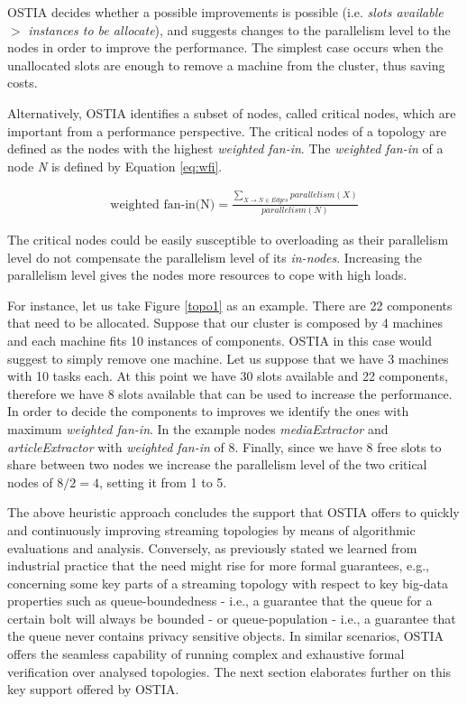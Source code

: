 OSTIA decides whether a possible improvements is possible (i.e. \emph{slots
  available} $>$ \emph{instances to be allocate}), and suggests changes to the
parallelism level to the nodes in order to improve the performance. The simplest
case occurs when the unallocated slots are enough to remove a machine from the
cluster, thus saving costs.

Alternatively, OSTIA identifies a subset of nodes, called critical nodes, which
are important from a performance perspective. The critical nodes of a topology
are defined as the nodes with the highest \emph{weighted fan-in}. The
\emph{weighted fan-in} of a node \emph{N} is defined by Equation \ref{eq:wfi}.

\begin{align}
  \text{weighted fan-in(N)} = \frac{\sum_{X \rightarrow N \in Edges} parallelism(X)}{parallelism(N)} \label{eq:wfi}
\end{align}

The critical nodes could be easily susceptible to overloading as their
parallelism level do not compensate the parallelism level of its
\emph{in-nodes}. Increasing the parallelism level gives the nodes more resources
to cope with high loads.

For instance, let us take Figure \ref{topo1} as an example. There are 22
components that need to be allocated. Suppose that our cluster is composed by 4
machines and each machine fits 10 instances of components. OSTIA in this case
would suggest to simply remove one machine. Let us suppose that we have 3
machines with 10 tasks each. At this point we have 30 slots available and 22
components, therefore we have 8 slots available that can be used to increase the
performance. In order to decide the components to improves we identify the ones
with maximum \emph{weighted fan-in}. In the example nodes \emph{mediaExtractor}
and \emph{articleExtractor} with \emph{weighted fan-in} of 8. Finally, since we
have 8 free slots to share between two nodes we increase the parallelism level
of the two critical nodes of $8/2 = 4$, setting it from 1 to 5.

The above heuristic approach concludes the support that OSTIA offers to quickly and continuously improving streaming topologies by means of algorithmic evaluations and analysis. Conversely, as previously stated we learned from industrial practice that the need might rise for more formal guarantees, e.g., concerning some key parts of a streaming topology with respect to key big-data properties such as queue-boundedness - i.e., a guarantee that the queue for a certain bolt will always be bounded - or queue-population - i.e., a guarantee that the queue never contains privacy sensitive objects. In similar scenarios, OSTIA offers the seamless capability of running complex and exhaustive formal verification over analysed topologies. The next section elaborates further on this key support offered by OSTIA.

